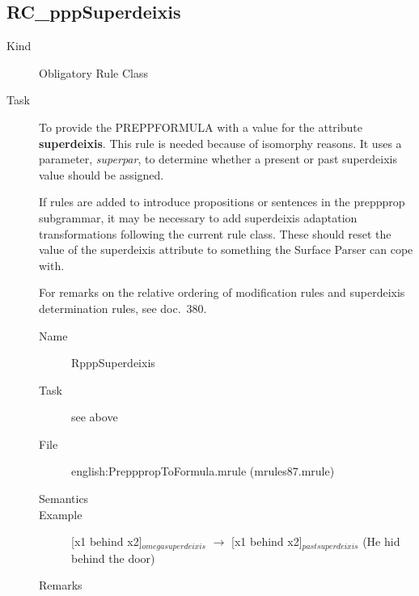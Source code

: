 \subsection{RC\_pppSuperdeixis}
\begin{description}
\item[Kind] Obligatory Rule Class
\item[Task] To provide the PREPPFORMULA with a value for the attribute {\bf 
superdeixis}. This rule is needed because of isomorphy reasons. It uses a 
parameter, {\em superpar\/}, to determine whether a present or past superdeixis 
value should be assigned.

If rules are added to introduce propositions or sentences in the preppprop 
subgrammar, it may be necessary to add superdeixis adaptation transformations 
following the current rule class. These should reset the value of the 
superdeixis attribute to something the Surface Parser can cope with.

For remarks on the relative ordering of modification rules and superdeixis 
determination rules, see doc.\ 380.

\vspace{1 cm}
\begin{description}
\item[Name] RpppSuperdeixis
\item[Task] see above
\item[File] english:PrepppropToFormula.mrule (mrules87.mrule)
\item[Semantics]
\item[Example] [x1 behind x2]$_{omegasuperdeixis}$ $\rightarrow$ [x1 behind 
x2]$_{pastsuperdeixis}$ (He hid behind the door)
\item[Remarks]
\end{description}

\end{description}

\newpage
